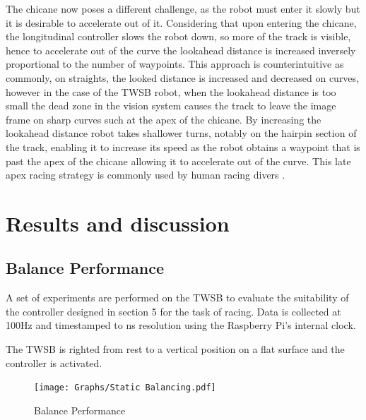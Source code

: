             The chicane now poses a different challenge, as the robot must enter it slowly but it is desirable to accelerate out of it.
            Considering that upon entering the chicane, the longitudinal controller slows the robot down, so more of the track is visible, 
            hence to accelerate out of the curve the lookahead distance is increased inversely proportional to the number of waypoints. 
            This approach is counterintuitive as commonly, on straights, the looked distance is increased 
            and decreased on curves, however in the case of the TWSB robot, when the lookahead distance is too small the dead zone
            in the vision system causes the track to leave the image frame on sharp curves such at the apex of
            the chicane. By increasing the lookahead distance robot takes shallower turns, notably on the hairpin section of the track, enabling it to 
            increase its speed as the robot obtains a waypoint that is past the apex of the chicane allowing it to accelerate out 
            of the curve. This late apex racing strategy is commonly used by human racing divers \cite{kegelman2017insights}.
        
    \pagebreak{}


  \section{Results and discussion} %
    \subsection{Balance Performance}

    A set of experiments are performed on the TWSB to evaluate the suitability of the controller designed in section 5 for the task of racing. 
    Data is collected at 100Hz and timestamped to ns resolution using the Raspberry Pi's internal clock. 

    The TWSB is righted from rest to a vertical position on a flat surface and the controller is activated. 

    \begin{figure}[H]
        \centering
        \texttt{[image: Graphs/Static Balancing.pdf]}
        \caption{Balance Performance}
        \label{fig:BalancePerformance}
    \end{figure}

